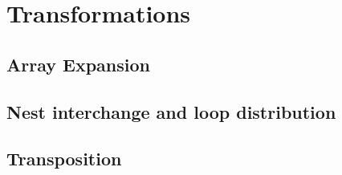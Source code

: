 \section{Transformations}

\subsection{Array Expansion}

\subsection{Nest interchange and loop distribution}

\subsection{Transposition}

